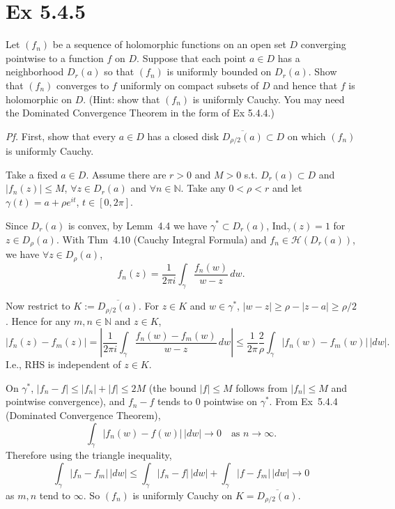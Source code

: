 \documentclass[a4paper]{article}
\newcommand{\N}{\mathbb{N}}
\newcommand{\Hol}{\mathcal{H}}
\begin{document}
\newpage
\section*{Ex 5.4.5}

\begin{tcolorbox}[colback=gray!10, colframe=black, boxrule=0.5pt, arc=2mm]
Let $(f_n)$ be a sequence of holomorphic functions on an open set $D$ converging
pointwise to a function $f$ on $D$. Suppose that each point $a \in D$ has a
neighborhood $D_r(a)$ so that $(f_n)$ is uniformly bounded on $D_r(a)$. Show that
$(f_n)$ converges to $f$ uniformly on compact subsets of $D$ and hence that $f$ is
holomorphic on $D$. (Hint: show that $(f_n)$ is uniformly Cauchy. You may need the
Dominated Convergence Theorem in the form of Ex 5.4.4.)
\end{tcolorbox}

\textit{Pf.} First, show that every $a \in D$ has a closed disk $\overline{D_{\rho/2}(a)} \subset D$
on which $(f_n)$ is uniformly Cauchy.

\medskip
Take a fixed $a \in D$. Assume there are $r > 0$ and $M > 0$ s.t.
$D_r(a) \subset D$ and $|f_n(z)| \leq M$, $\forall z \in D_r(a)$ and $\forall n \in \N$. Take
any $0 < \rho < r$ and let $\gamma(t) = a + \rho e^{it}$, $t \in [0, 2\pi]$.

Since $D_r(a)$ is convex, by Lemm~4.4 we have $\gamma^* \subset D_r(a)$, $\mathrm{Ind}_\gamma(z) = 1$ for
$z \in D_\rho(a)$. With Thm~4.10 (Cauchy Integral Formula) and $f_n \in \Hol(D_r(a))$, we have $\forall z \in D_\rho(a)$,
\[
f_n(z) = \frac{1}{2\pi i} \int_\gamma \frac{f_n(w)}{w - z}\, dw.
\]

\medskip
Now restrict to $K := \overline{D_{\rho/2}(a)}$. For $z \in K$ and $w \in \gamma^*$,
$|w - z| \geq \rho - |z - a| \geq \rho/2$. Hence for any $m, n \in \N$ and $z \in K$,
\[
|f_n(z) - f_m(z)|
= \left|\frac{1}{2\pi i}\int_\gamma \frac{f_n(w) - f_m(w)}{w-z}\, dw\right|
\leq \frac{1}{2\pi} \frac{2}{\rho}\int_\gamma |f_n(w) - f_m(w)|\,|dw|.
\]
I.e., RHS is independent of $z \in K$.

\medskip
On $\gamma^*$, $|f_n - f| \leq |f_n| + |f| \leq 2M$ (the bound $|f| \leq M$ follows from
$|f_n| \leq M$ and pointwise convergence), and $f_n - f$ tends to $0$ pointwise on $\gamma^*$.
From Ex~5.4.4 (Dominated Convergence Theorem),
\[
\int_\gamma |f_n(w) - f(w)|\, |dw| \to 0 \quad \text{as } n \to \infty.
\]
Therefore using the triangle inequality,
\[
\int_\gamma |f_n - f_m|\, |dw|
\leq \int_\gamma |f_n - f|\, |dw| + \int_\gamma |f - f_m|\, |dw| \to 0
\]
as $m, n$ tend to $\infty$. So $(f_n)$ is uniformly Cauchy on $K = \overline{D_{\rho/2}(a)}$.
\end{document}
